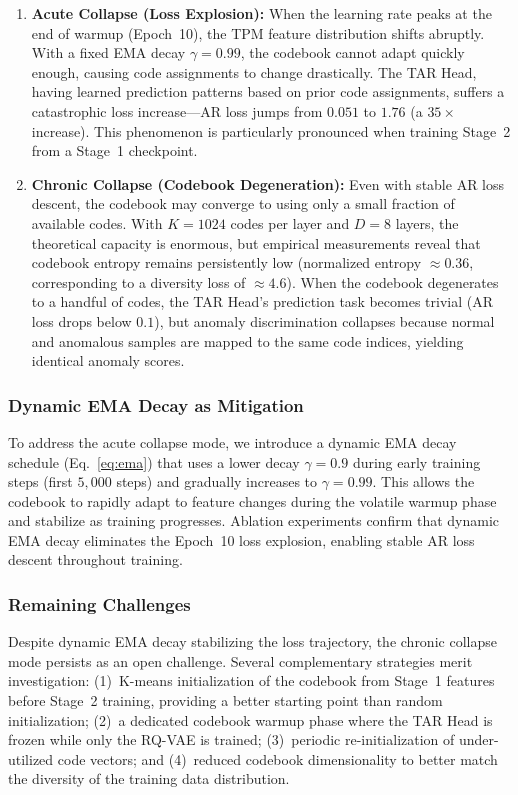 \documentclass[lettersize,journal]{IEEEtran}
\begin{document}
\begin{enumerate}
\item \textbf{Acute Collapse (Loss Explosion):} When the learning rate peaks at the end of warmup (Epoch~10), the TPM feature distribution shifts abruptly. With a fixed EMA decay $\gamma = 0.99$, the codebook cannot adapt quickly enough, causing code assignments to change drastically. The TAR Head, having learned prediction patterns based on prior code assignments, suffers a catastrophic loss increase---AR loss jumps from $0.051$ to $1.76$ (a $35\times$ increase). This phenomenon is particularly pronounced when training Stage~2 from a Stage~1 checkpoint.

\item \textbf{Chronic Collapse (Codebook Degeneration):} Even with stable AR loss descent, the codebook may converge to using only a small fraction of available codes. With $K = 1024$ codes per layer and $D = 8$ layers, the theoretical capacity is enormous, but empirical measurements reveal that codebook entropy remains persistently low (normalized entropy $\approx 0.36$, corresponding to a diversity loss of $\approx 4.6$). When the codebook degenerates to a handful of codes, the TAR Head's prediction task becomes trivial (AR loss drops below $0.1$), but anomaly discrimination collapses because normal and anomalous samples are mapped to the same code indices, yielding identical anomaly scores.
\end{enumerate}

\subsubsection{Dynamic EMA Decay as Mitigation}

To address the acute collapse mode, we introduce a dynamic EMA decay schedule (Eq.~\ref{eq:ema}) that uses a lower decay $\gamma = 0.9$ during early training steps (first $5{,}000$ steps) and gradually increases to $\gamma = 0.99$. This allows the codebook to rapidly adapt to feature changes during the volatile warmup phase and stabilize as training progresses. Ablation experiments confirm that dynamic EMA decay eliminates the Epoch~10 loss explosion, enabling stable AR loss descent throughout training.

\subsubsection{Remaining Challenges}

Despite dynamic EMA decay stabilizing the loss trajectory, the chronic collapse mode persists as an open challenge. Several complementary strategies merit investigation: (1)~K-means initialization of the codebook from Stage~1 features before Stage~2 training, providing a better starting point than random initialization; (2)~a dedicated codebook warmup phase where the TAR Head is frozen while only the RQ-VAE is trained; (3)~periodic re-initialization of under-utilized code vectors; and (4)~reduced codebook dimensionality to better match the diversity of the training data distribution.
\end{document}
